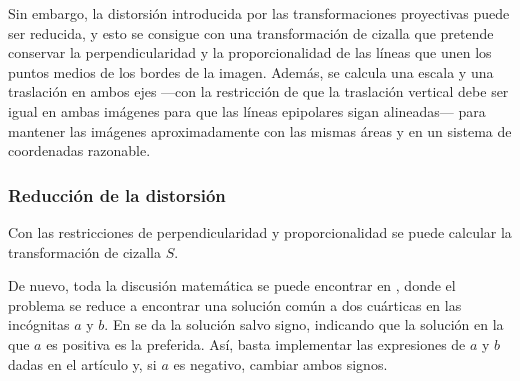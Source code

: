 \documentclass[a4paper, 11pt]{article}
\theoremstyle{definition}
\begin{document}
    Sin embargo, la distorsión introducida por las transformaciones proyectivas puede ser reducida, y esto se consigue con una transformación de cizalla que pretende conservar la perpendicularidad y la proporcionalidad de las líneas que unen los puntos medios de los bordes de la imagen. Además, se calcula una escala y una traslación en ambos ejes ---con la restricción de que la traslación vertical debe ser igual en ambas imágenes para que las líneas epipolares sigan alineadas--- para mantener las imágenes aproximadamente con las mismas áreas y en un sistema de coordenadas razonable.

    \subsubsection{Reducción de la distorsión}
    Con las restricciones de perpendicularidad y proporcionalidad se puede calcular la transformación de cizalla $S$.

    De nuevo, toda la discusión matemática se puede encontrar en \cite{LoopZhang}, donde el problema se reduce a encontrar una solución común a dos cuárticas en las incógnitas $a$ y $b$. En \cite{LoopZhang} se da la solución salvo signo, indicando que la solución en la que $a$ es positiva es la preferida. Así, basta implementar las expresiones de $a$ y $b$ dadas en el artículo y, si $a$ es negativo, cambiar ambos signos.
\end{document}
